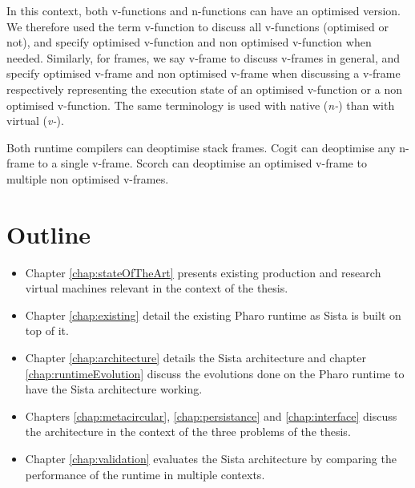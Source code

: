 \documentclass[a4paper,12pt,twoside]{../includes/ThesisStyle}
\begin{document}
In this context, both v-functions and n-functions can have an optimised version. We therefore used the term v-function to discuss all v-functions (optimised or not), and specify optimised v-function and non optimised v-function when needed. Similarly, for frames, we say v-frame to discuss v-frames in general, and specify optimised v-frame and non optimised v-frame when discussing a v-frame respectively representing the execution state of an optimised v-function or a non optimised v-function. The same terminology is used with native (\emph{n-}) than with virtual (\emph{v-}).

Both runtime compilers can deoptimise stack frames. Cogit can deoptimise any n-frame to a single v-frame. 
Scorch can deoptimise an optimised v-frame to multiple non optimised v-frames. 

\section{Outline}

\begin{itemize}
	\item Chapter \ref{chap:stateOfTheArt} presents existing production and research virtual machines relevant in the context of the thesis. 
	\item Chapter \ref{chap:existing} detail the existing Pharo runtime as Sista is built on top of it.
	\item Chapter \ref{chap:architecture} details the Sista architecture and chapter \ref{chap:runtimeEvolution} discuss the evolutions done on the Pharo runtime to have the Sista architecture working.
	\item Chapters \ref{chap:metacircular}, \ref{chap:persistance} and \ref{chap:interface} discuss the architecture in the context of the three problems of the thesis. 
	\item Chapter \ref{chap:validation} evaluates the Sista architecture by comparing the performance of the runtime in multiple contexts.
\end{itemize}



\ifx\wholebook\relax\else
    
\end{document}
